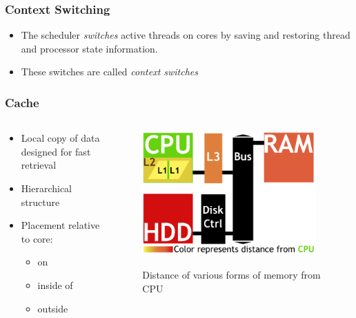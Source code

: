 \documentclass{beamer}
\newcommand{\linespace}{\vskip 0.25cm}
\begin{document}
\begin{frame}
\frametitle{Context Switching}
\begin{itemize}
\item The scheduler \emph{switches} active threads on cores by saving and restoring thread and processor state information.
\item These switches are called \emph{context switches}
\end{itemize}
\end{frame}

\begin{frame}
\frametitle{Cache}

\begin{columns}
\begin{column}{0.5\textwidth}
\begin{itemize}
	\item Local copy of data designed for fast retrieval
	\item Hierarchical structure %
	\linespace
	\item Placement relative to core:
	\begin{itemize}
		\item on
		\item inside of
		\item outside

	\end{itemize}
\end{itemize}

\end{column}
\begin{column}{0.5\textwidth}
		\begin{figure}
		\includegraphics[width=0.95\textwidth]{Illustrations/CacheAbstract}
		\label{fig:domains}
		\caption{Distance of various forms of memory from CPU}
		\end{figure}
	\end{column}
\end{columns}
\end{frame}
\end{document}
